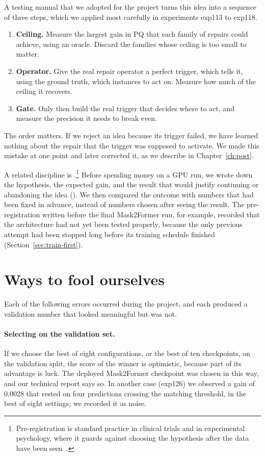 A testing manual that we adopted for the project turns this idea into a sequence of three steps,
which we applied most carefully in experiments exp113 to exp118.
\begin{enumerate}[leftmargin=*,itemsep=2pt]
\item \textbf{Ceiling.} Measure the largest gain in PQ that each family of repairs could achieve,
using an oracle. Discard the families whose ceiling is too small to matter.
\item \textbf{Operator.} Give the real repair operator a perfect trigger, which tells it, using the
ground truth, which instances to act on. Measure how much of the ceiling it recovers.
\item \textbf{Gate.} Only then build the real trigger that decides where to act, and measure the
precision it needs to break even.
\end{enumerate}
The order matters. If we reject an idea because its trigger failed, we have learned nothing about
the repair that the trigger was supposed to activate. We made this mistake at one point and later
corrected it, as we describe in Chapter~\ref{ch:post}.

A related discipline is .\footnote{Pre-registration is standard practice
in clinical trials and in experimental psychology, where it guards against choosing the hypothesis
after the data have been seen~\citep{nosek2018}.} Before spending money on a GPU run, we wrote down the hypothesis, the expected gain, and the result that would justify continuing or abandoning
the idea (). We then compared the outcome with numbers that had been
fixed in advance, instead of numbers chosen after seeing the result. The pre-registration written
before the final Mask2Former run, for example, recorded that the architecture had not yet been
tested properly, because the only previous attempt had been stopped long before its training
schedule finished (Section~\ref{sec:train-first}).

\section{Ways to fool ourselves}\label{sec:val-traps}
Each of the following errors occurred during the project, and each produced a validation number
that looked meaningful but was not.

\paragraph{Selecting on the validation set.} If we choose the best of eight configurations, or the
best of ten checkpoints, on the validation split, the score of the winner is optimistic, because
part of its advantage is luck. The deployed Mask2Former checkpoint was chosen in this way, and our
technical report says so. In another case (exp126) we observed a gain of 0.0028 that rested on four
predictions crossing the matching threshold, in the best of eight settings; we recorded it as noise.

